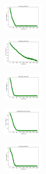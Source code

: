 \vspace*{\fill}
\newpage
\vspace*{\fill}

\begin{figure}[H]
    \centering
    \begin{subfigure}
        \centering
        \includegraphics[width=0.234\textwidth]{img/aggsf/iris_set_const_20_949004259_cost.png}
    \end{subfigure}
    \hfill
    \begin{subfigure}
        \centering
        \includegraphics[width=0.234\textwidth]{img/aggsf/ecoli_set_const_20_949004259_cost.png}
    \end{subfigure}
    \hfill
    \begin{subfigure}
        \centering
        \includegraphics[width=0.234\textwidth]{img/aggsf/rand_set_const_20_949004259_cost.png}
    \end{subfigure}
    \hfill
    \begin{subfigure}
        \centering
        \includegraphics[width=0.234\textwidth]{img/aggsf/newthyroid_set_const_20_949004259_cost.png}
    \end{subfigure}
    \hfill
    \begin{subfigure}
        \centering
        \includegraphics[width=0.234\textwidth]{img/aggsf/iris_set_const_20_589741062_cost.png}

\end{subfigure}
\end{figure}
